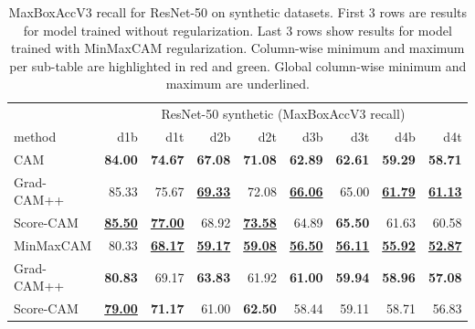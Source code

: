 \begin{table}[h]
\centering
\begin{tabular}{lrrrrrrrr}
\toprule
 & \multicolumn{8}{c}{ResNet-50 synthetic (MaxBoxAccV3 recall)} \\
method & d1b & d1t & d2b & d2t & d3b & d3t & d4b & d4t \\
\cmidrule(lr){1-1} \cmidrule(lr){2-9}
CAM & \color{purple} \bfseries 84.00 & \color{purple} \bfseries 74.67 & \color{purple} \bfseries 67.08 & \color{purple} \bfseries 71.08 & \color{purple} \bfseries 62.89 & \color{purple} \bfseries 62.61 & \color{purple} \bfseries 59.29 & \color{purple} \bfseries 58.71 \\
Grad-CAM++ & 85.33 & 75.67 & \color{teal} \bfseries \underline{69.33} & 72.08 & \color{teal} \bfseries \underline{66.06} & 65.00 & \color{teal} \bfseries \underline{61.79} & \color{teal} \bfseries \underline{61.13} \\
Score-CAM & \color{teal} \bfseries \underline{85.50} & \color{teal} \bfseries \underline{77.00} & 68.92 & \color{teal} \bfseries \underline{73.58} & 64.89 & \color{teal} \bfseries 65.50 & 61.63 & 60.58 \\
\cmidrule(lr){1-1} \cmidrule(lr){2-9}
MinMaxCAM & 80.33 & \color{purple} \bfseries \underline{68.17} & \color{purple} \bfseries \underline{59.17} & \color{purple} \bfseries \underline{59.08} & \color{purple} \bfseries \underline{56.50} & \color{purple} \bfseries \underline{56.11} & \color{purple} \bfseries \underline{55.92} & \color{purple} \bfseries \underline{52.87} \\
Grad-CAM++ & \color{teal} \bfseries 80.83 & 69.17 & \color{teal} \bfseries 63.83 & 61.92 & \color{teal} \bfseries 61.00 & \color{teal} \bfseries 59.94 & \color{teal} \bfseries 58.96 & \color{teal} \bfseries 57.08 \\
Score-CAM & \color{purple} \bfseries \underline{79.00} & \color{teal} \bfseries 71.17 & 61.00 & \color{teal} \bfseries 62.50 & 58.44 & 59.11 & 58.71 & 56.83 \\
\bottomrule
\end{tabular}
\caption[MaxBoxAccV3 recall for ResNet-50 on synthetic datasets]{MaxBoxAccV3 recall for ResNet-50 on synthetic datasets. First 3 rows are results for model trained without regularization. Last 3 rows show results for model trained with MinMaxCAM regularization. Column-wise minimum and maximum per sub-table are highlighted in red and green. Global column-wise minimum and maximum are underlined.}
\label{tab:maxboxaccv3_recall_resnet50_synthetic}
\end{table}

